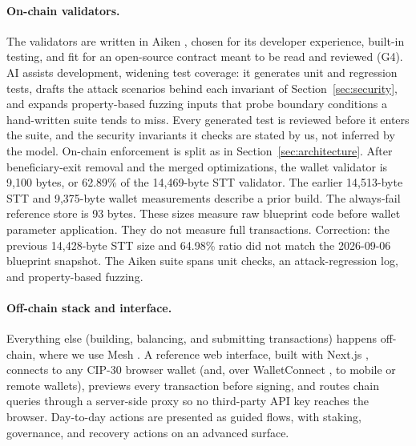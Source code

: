 \documentclass[11pt,DIV=11,parskip=half-]{scrartcl}
\begin{document}
\paragraph{On-chain validators.} The validators are written in Aiken \cite{aiken}, chosen for its developer experience, built-in testing, and fit for an open-source contract meant to be read and reviewed (G4). AI assists development, widening test coverage: it generates unit and regression tests, drafts the attack scenarios behind each invariant of Section~\ref{sec:security}, and expands property-based fuzzing inputs that probe boundary conditions a hand-written suite tends to miss. Every generated test is reviewed before it enters the suite, and the security invariants it checks are stated by us, not inferred by the model. On-chain enforcement is split as in Section~\ref{sec:architecture}. After beneficiary-exit removal and the merged optimizations, the wallet validator is 9,100 bytes, or 62.89\% of the 14,469-byte STT validator. The earlier 14,513-byte STT and 9,375-byte wallet measurements describe a prior build. The always-fail reference store is 93 bytes. These sizes measure raw blueprint code before wallet parameter application. They do not measure full transactions. Correction: the previous 14,428-byte STT size and 64.98\% ratio did not match the 2026-09-06 blueprint snapshot. The Aiken suite spans unit checks, an attack-regression log, and property-based fuzzing.

\paragraph{Off-chain stack and interface.} Everything else (building, balancing, and submitting transactions) happens off-chain, where we use Mesh \cite{meshjs}. A reference web interface, built with Next.js \cite{nextjs}, connects to any CIP-30 browser wallet \cite{cip30} (and, over WalletConnect \cite{walletconnect}, to mobile or remote wallets), previews every transaction before signing, and routes chain queries through a server-side proxy so no third-party API key reaches the browser. Day-to-day actions are presented as guided flows, with staking, governance, and recovery actions on an advanced surface.

\end{document}
